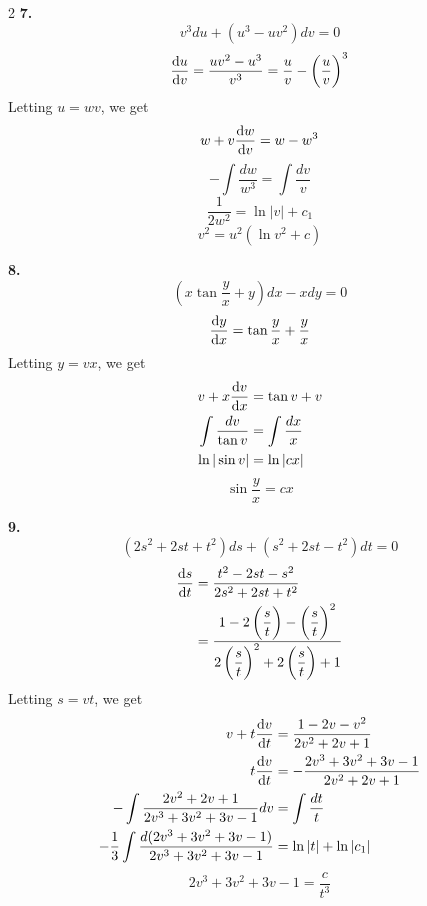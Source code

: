 {    \begin{multicols}{2}
        \textbf{7.}
        \[ v^3 d{u} + (u^3 - uv^2) d{v} = 0 \]
        \[ \dv{u}{v} = \frac{uv^2 - u^3}{v^3} = \frac{u}{v} - \left( \frac{u}{v} \right)^3 \]
        Letting $u = wv$, we get
        \[ w + v\dv{w}{v} = w - w^3 \]
        \[ -\int{\frac{dw}{w^3}} = \int{\frac{dv}{v}} \]
        \[ \frac{1}{2w^2} = \ln|v| + c_1 \]
        \[ \boxed{v^2 = u^2(\ln v^2 + c)} \]

        \columnbreak

        \textbf{8.}
        \[ \left( x\tan \frac{y}{x} + y \right) d{x} - x d{y} = 0 \]
        \[ \dv{y}{x} = \tan \frac{y}{x} + \frac{y}{x} \]
        Letting $y = vx$, we get
        \begin{align*}
            v + x\dv{v}{x} &= \tan v + v \\
            \int{\frac{dv}{\tan v}} &= \int{\frac{dx}{x}} \\
            \ln|\sin v| &= \ln|cx|
        \end{align*}
        \[ \boxed{\sin \frac{y}{x} = cx} \]
    \end{multicols}
      \textbf{9.}
        \[ (2s^2+2st+t^2) d{s} + (s^2+2st-t^2) d{t} = 0 \]
        \begin{align*}
            \dv{s}{t} &= \frac{t^2 - 2st - s^2}{2s^2 + 2st + t^2} \\
            &= \frac{1 - 2\left(\dfrac{s}{t}\right) - \left(\dfrac{s}{t}\right)^2}{2\left(\dfrac{s}{t}\right)^2 + 2\left(\dfrac{s}{t}\right) + 1} \\
        \end{align*}
        Letting $s = vt$, we get
        \begin{align*}
            v + t\dv{v}{t} &= \frac{1-2v-v^2}{2v^2+2v+1} \\
            t\dv{v}{t} &= -\frac{2v^3+3v^2+3v-1}{2v^2+2v+1} \\
            -\int{\frac{2v^2+2v+1}{2v^3+3v^2+3v-1}} d{v} &= \int{\frac{dt}{t}} \\
            -\frac{1}{3} \int{\frac{d(2v^3+3v^2+3v-1)}{2v^3+3v^2+3v-1}} &= \ln|t| + \ln|c_1|
        \end{align*}
        \[ \boxed{2v^3 + 3v^2 + 3v -1 = \frac{c}{t^3}} \]

}
